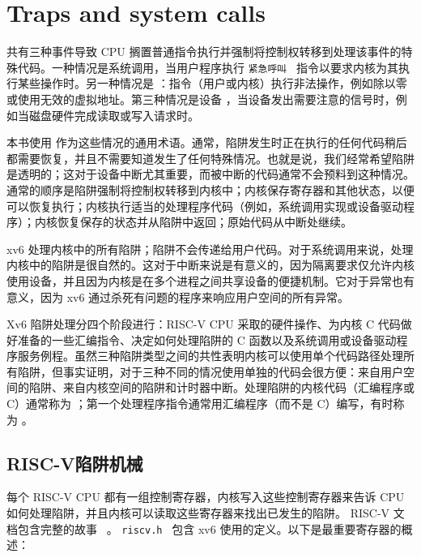 \documentclass[UTF8]{article}
\begin{document}
   \chapter{Traps and system calls}   
    \label{CH:TRAP}     

共有三种事件导致 CPU 搁置普通指令执行并强制将控制权转移到处理该事件的特殊代码。一种情况是系统调用，当用户程序执行  {    \tt    紧急呼叫   }  指令以要求内核为其执行某些操作时。另一种情况是        ：指令（用户或内核）执行非法操作，例如除以零或使用无效的虚拟地址。第三种情况是设备        ，当设备发出需要注意的信号时，例如当磁盘硬件完成读取或写入请求时。  

本书使用        作为这些情况的通用术语。通常，陷阱发生时正在执行的任何代码稍后都需要恢复，并且不需要知道发生了任何特殊情况。也就是说，我们经常希望陷阱是透明的；这对于设备中断尤其重要，而被中断的代码通常不会预料到这种情况。通常的顺序是陷阱强制将控制权转移到内核中；内核保存寄存器和其他状态，以便可以恢复执行；内核执行适当的处理程序代码（例如，系统调用实现或设备驱动程序）；内核恢复保存的状态并从陷阱中返回；原始代码从中断处继续。  

xv6 处理内核中的所有陷阱；陷阱不会传递给用户代码。对于系统调用来说，处理内核中的陷阱是很自然的。这对于中断来说是有意义的，因为隔离要求仅允许内核使用设备，并且因为内核是在多个进程之间共享设备的便捷机制。它对于异常也有意义，因为 xv6 通过杀死有问题的程序来响应用户空间的所有异常。  

Xv6 陷阱处理分四个阶段进行：RISC-V CPU 采取的硬件操作、为内核 C 代码做好准备的一些汇编指令、决定如何处理陷阱的 C 函数以及系统调用或设备驱动程序服务例程。虽然三种陷阱类型之间的共性表明内核可以使用单个代码路径处理所有陷阱，但事实证明，对于三种不同的情况使用单独的代码会很方便：来自用户空间的陷阱、来自内核空间的陷阱和计时器中断。处理陷阱的内核代码（汇编程序或 C）通常称为        ；第一个处理程序指令通常用汇编程序（而不是 C）编写，有时称为        。  

   \section{RISC-V陷阱机械  }     

每个 RISC-V CPU 都有一组控制寄存器，内核写入这些控制寄存器来告诉 CPU 如何处理陷阱，并且内核可以读取这些寄存器来找出已发生的陷阱。 RISC-V 文档包含完整的故事~    \cite{riscv:priv}    。  {    \tt    riscv.h   } 
        包含 xv6 使用的定义。以下是最重要寄存器的概述：  
\end{document}
